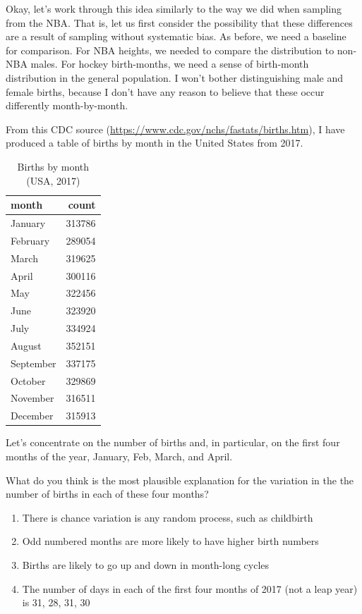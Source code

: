\documentclass[
  openany]{book}
\providecommand{\tightlist}{%
  \setlength{\itemsep}{0pt}\setlength{\parskip}{0pt}}
\begin{document}
Okay, let's work through this idea similarly to the way we did when sampling from the NBA. That is, let us first consider the possibility that these differences are a result of sampling without systematic bias. As before, we need a baseline for comparison. For NBA heights, we needed to compare the distribution to non-NBA males. For hockey birth-months, we need a sense of birth-month distribution in the general population. I won't bother distinguishing male and female births, because I don't have any reason to believe that these occur differently month-by-month.

From this CDC source (\url{https://www.cdc.gov/nchs/fastats/births.htm}), I have produced a table of births by month in the United States from 2017.

\begin{table}[!h]

\caption{\label{tab:birthmonth-table}Births by month (USA, 2017)}
\centering
\begin{tabular}[t]{lr}
\toprule
month & count\\
\midrule
January & 313786\\
February & 289054\\
March & 319625\\
April & 300116\\
May & 322456\\
\addlinespace
June & 323920\\
July & 334924\\
August & 352151\\
September & 337175\\
October & 329869\\
\addlinespace
November & 316511\\
December & 315913\\
\bottomrule
\end{tabular}
\end{table}

Let's concentrate on the number of births and, in particular, on the first four months of the year, January, Feb, March, and April.

What do you think is the most plausible explanation for the variation in the the number of births in each of these four months?

\begin{enumerate}
\def\labelenumi{\alph{enumi}.}
\tightlist
\item
  There is chance variation is any random process, such as childbirth
\item
  Odd numbered months are more likely to have higher birth numbers
\item
  Births are likely to go up and down in month-long cycles
\item
  The number of days in each of the first four months of 2017 (not a leap year) is 31, 28, 31, 30
\end{enumerate}
\end{document}
